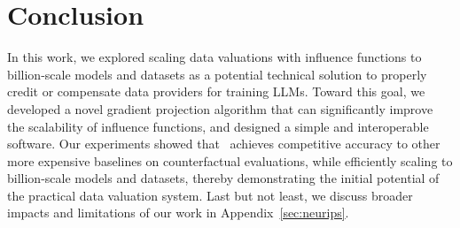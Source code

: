 \section{Conclusion}
In this work, we explored scaling data valuations with influence functions to billion-scale models and datasets as a potential technical solution to properly credit or compensate data providers for training LLMs. Toward this goal, we developed a novel gradient projection algorithm that can significantly improve the scalability of influence functions, and designed a simple and interoperable software. Our experiments showed that \method\ achieves competitive accuracy to other more expensive baselines on counterfactual evaluations, while efficiently scaling to billion-scale models and datasets, thereby demonstrating the initial potential of the practical data valuation system. Last but not least, we discuss broader impacts and limitations of our work in Appendix~\ref{sec:neurips}.
